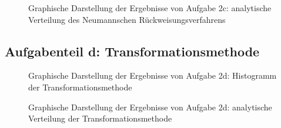 \begin{landscape}
	\begin{figure}
		\caption{Graphische Darstellung der Ergebnisse von Aufgabe 2c: analytische Verteilung des Neumannschen Rückweisungsverfahrens}
		\label{fig:2c_v}
	\end{figure}
\end{landscape}

\subsection*{Aufgabenteil d: Transformationsmethode}
\begin{landscape}
	\begin{figure}
		\caption{Graphische Darstellung der Ergebnisse von Aufgabe 2d: Histogramm der Transformationsmethode}
		\label{fig:2d}
	\end{figure}
\end{landscape}

\begin{landscape}
	\begin{figure}
		\caption{Graphische Darstellung der Ergebnisse von Aufgabe 2d: analytische Verteilung der Transformationsmethode}
		\label{fig:2d_v}
	\end{figure}
\end{landscape}



